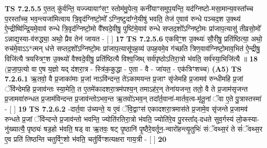 \documentclass[17pt]{extarticle}
\begin{document}
                                \textbf{ TS 7.2.5.5} \newline
                  ए॒तत् कु॑र्वन्ति॒ यज्ज्यायाꣳ॑सꣳ॒॒ स्तोम॑मु॒पेत्य॒ कनी॑याꣳसमुप॒यन्ति॒ यद॑ग्निष्टो-मसा॒मान्य॒वस्ता᳚च्च प॒रस्ता᳚च्च॒ भव॒न्त्यजा॑मित्वाय त्रि॒वृद॑ग्निष्टो॒मो᳚ ऽग्नि॒ष्टुदा᳚ग्ने॒यीषु॑ भवति॒ तेज॑ ए॒वाव॑ रुन्धे पञ्चद॒श उ॒क्थ्य॑ ऐ॒न्द्रीष्वि॑न्द्रि॒यमे॒वाव॑ रुन्धे त्रि॒वृद॑ग्निष्टो॒मो वै᳚श्वदे॒वीषु॒ पुष्टि॑मे॒वाव॑ रुन्धे सप्तद॒शो᳚ऽग्निष्टो॒मः प्रा॑जाप॒त्यासु॑ तीव्रसो॒मो᳚ ऽन्नाद्य॒स्या-व॑रुद्ध्या॒ अथो॒ प्रैव तेन॑ जायत - [  ] \textbf{  17} \newline
                  \newline
                                \textbf{ TS 7.2.5.6} \newline
                  एकविꣳ॒॒श उ॒क्थ्यः॑ सौ॒रीषु॒ प्रति॑ष्ठित्या॒ अथो॒ रुच॑मे॒वाऽऽ*त्मन् ध॑त्ते सप्तद॒शो᳚ऽग्निष्टो॒मः प्रा॑जाप॒त्यासू॑पह॒व्य॑ उपह॒वमे॒व ग॑च्छति त्रिण॒वाव॑ग्निष्टो॒माव॒भित॑ ऐ॒न्द्रीषु॒ विजि॑त्यै त्रयस्त्रिꣳ॒॒श उ॒क्थ्यो॑ वैश्वदे॒वीषु॒ प्रति॑ष्ठित्यै विश्व॒जिथ् सर्व॑पृष्ठोऽतिरा॒त्रो भ॑वति॒ सर्व॑स्या॒भिजि॑त्यै ॥ \textbf{  18} \newline
                  \newline
                      (प्र॒जा॒प॒त्यो वा ए॒ष य॒ज्ञो यद् द॑शरा॒त्र - स्त्रि॑क॒कुद्धा - ए॒ता - वै - जा॑यत॒ - एक॑त्रिꣳशच्च)  \textbf{(A5)} \newline \newline
                                        \textbf{ TS 7.2.6.1} \newline
                  ऋ॒तवो॒ वै प्र॒जाका॑माः प्र॒जां नाऽवि॑न्दन्त॒ ते॑ऽकामयन्त प्र॒जाꣳ सृ॑जेमहि प्र॒जामव॑ रुन्धीमहि प्र॒जां ॅवि॑न्देमहि प्र॒जाव॑न्तः स्या॒मेति॒ त ए॒तमे॑कादशरा॒त्रम॑पश्य॒न् तमाऽह॑र॒न् तेना॑यजन्त॒ ततो॒ वै ते प्र॒जाम॑सृजन्त प्र॒जामवा॑रुन्धत प्र॒जाम॑विन्दन्त प्र॒जाव॑न्तोऽभव॒न्त ऋ॒तवो॑ऽभव॒न् तदा᳚र्त॒वाना॑-मार्तव॒त्व-मृ॑तू॒नां ॅवा ए॒ते पु॒त्रास्तस्मा॑ - [  ] \textbf{  19} \newline
                  \newline
                                \textbf{ TS 7.2.6.2} \newline
                  -दार्त॒वा उ॑च्यन्ते॒ य ए॒वं ॅवि॒द्वाꣳस॑ एकादशरा॒त्रमास॑ते प्र॒जामे॒व सृ॑जन्ते प्र॒जामव॑ रुन्धते प्र॒जां ॅवि॑न्दन्ते प्र॒जाव॑न्तो भवन्ति॒ ज्योति॑रतिरा॒त्रो भ॑वति॒ ज्योति॑रे॒व पु॒रस्ता᳚द्-दधते सुव॒र्गस्य॑ लो॒कस्या-नु॑ख्यात्यै॒ पृष्ठ्यः॑ षड॒हो भ॑वति॒ षड् वा ऋ॒तवः॒ षट् पृ॒ष्ठानि॑ पृ॒ष्ठैरे॒वर्तून॒-न्वारो॑हन्त्यृ॒तुभिः॑ संॅवथ्स॒रं ते सं॑ॅवथ्स॒र ए॒व प्रति॑ तिष्ठन्ति चतुर्विꣳ॒॒शो भ॑वति॒ चतु॑र्विꣳशत्यक्षरा गाय॒त्री - [  ] \textbf{  20} \newline
\end{document}
